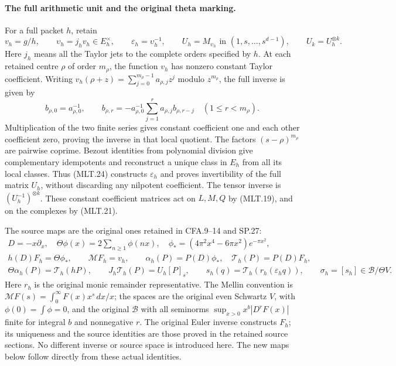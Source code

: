 \paragraph{The full arithmetic unit and the original theta marking.}
For a full packet \(h\), retain
\[
 v_h=g/h,\qquad \upsilon_h=j_hv_h\in E_h^\times,\qquad
 \varepsilon_h=\upsilon_h^{-1},\qquad
 U_h=M_{\upsilon_h}\text{ in }(1,s,\ldots,s^{d-1}),
 \qquad U_k=U_h^{\otimes k}.                              \tag{MLT.23}
\]
Here \(j_h\) means all the Taylor jets to the
complete orders specified by \(h\).
At each retained centre \(\rho\) of order \(m_\rho\),
the function \(v_h\) has nonzero constant Taylor
coefficient. Writing
\(v_h(\rho+z)=\sum_{j=0}^{m_\rho-1}a_{\rho,j}z^j\)
modulo \(z^{m_\rho}\), the full inverse is given by
\[
 b_{\rho,0}=a_{\rho,0}^{-1},\qquad
 b_{\rho,r}=-a_{\rho,0}^{-1}
              \sum_{j=1}^r a_{\rho,j}b_{\rho,r-j}
                  \quad(1\le r<m_\rho).                 \tag{MLT.24}
\]
Multiplication of the two finite series gives
constant coefficient one and each other
coefficient zero, proving the inverse in that
local quotient. The factors \((s-\rho)^{m_\rho}\)
are pairwise coprime. Bezout identities from
polynomial division give complementary
idempotents and reconstruct a unique class
in \(E_h\) from all its local classes. Thus
(MLT.24) constructs \(\varepsilon_h\) and
proves invertibility of the full matrix \(U_h\),
without discarding any nilpotent coefficient.
The tensor inverse is \((U_h^{-1})^{\otimes k}\).
These constant coefficient matrices act on
\(L,M,Q\) by (MLT.19), and on the complexes
by (MLT.21).

The source maps are the original ones retained
in CFA.9--14 and SP.27:
\[
 \begin{gathered}
 D=-x\partial_x,\quad
 \Theta\phi(x)=2\sum_{n\ge1}\phi(nx),\quad
 \phi_*=(4\pi^2x^4-6\pi x^2)e^{-\pi x^2},\\
 h(D)F_h=\Theta\phi_*,\qquad
 \mathcal MF_h=v_h,\qquad
 \alpha_h(P)=P(D)\phi_*,\quad\mathcal T_h(P)=P(D)F_h,\\
 \Theta\alpha_h(P)=\mathcal T_h(hP),\qquad
 J_h\mathcal T_h(P)=U_h[P]_s,\qquad
 s_h(q)=\mathcal T_h(r_h(\varepsilon_h q)),\qquad
 \sigma_h=[s_h]\in\mathscr B/\Theta V .
 \end{gathered}                                             \tag{MLT.25}
\]
Here \(r_h\) is the original monic remainder
representative. The Mellin convention is
\(\mathcal MF(s)=\int_0^\infty F(x)x^s\,dx/x\);
the spaces are the original even Schwartz
\(V\), with \(\phi(0)=\int\phi=0\), and the
original \(\mathscr B\) with all seminorms
\(\sup_{x>0}x^b|D^rF(x)|\) finite for integral
\(b\) and nonnegative \(r\).
The original Euler inverse constructs \(F_h\);
its uniqueness and the source identities are
those proved in the retained source sections.
No different inverse or source space is
introduced here. The new maps below follow
directly from these actual identities.

